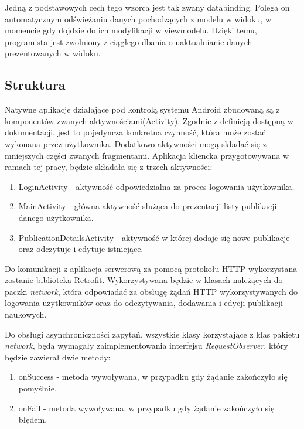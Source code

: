 \documentclass[a4paper,12pt,twoside,openany]{report}
\begin{document}
Jedną z podstawowych cech tego wzorca jest tak zwany databinding. Polega on automatycznym odświeżaniu danych pochodzących z modelu w widoku, w momencie gdy dojdzie do ich modyfikacji w viewmodelu. Dzięki temu, programista jest zwolniony z ciągłego dbania o uaktualnianie danych prezentowanych w widoku.

\newpage
\subsection{Struktura}
Natywne aplikacje działające pod kontrolą systemu Android zbudowaną są z komponentów zwanych aktywnościami(Activity). Zgodnie z definicją dostępną w dokumentacji, jest to  pojedyncza konkretna czynność, która może zostać wykonana przez użytkownika. Dodatkowo aktywności mogą składać się z mniejszych części zwanych fragmentami. Aplikacja kliencka przygotowywana w ramach tej pracy, będzie składała się z trzech aktywności:
\begin{enumerate}
	\item LoginActivity - aktywność odpowiedzialna za proces logowania użytkownika.
	
	\item MainActivity - główna aktywność służąca do prezentacji listy publikacji danego użytkownika. 

	\item PublicationDetailsActivity - aktywność w której dodaje się nowe publikacje oraz odczytuje i edytuje istniejące.

\end{enumerate}

Do komunikacji z aplikacja serwerową za pomocą protokołu HTTP wykorzystana zostanie biblioteka Retrofit. Wykorzystywana będzie w klasach należących do paczki \textit{network}, która odpowiadać za obsługę żądań HTTP wykorzystywanych do logowania użytkowników oraz do odczytywania, dodawania i edycji publikacji naukowych. 

Do obsługi asynchroniczności zapytań, wszystkie klasy korzystające z klas pakietu \textit{network}, będą wymagały zaimplementowania interfejsu \textit{RequestObserver}, który będzie zawierał dwie metody:
\begin{enumerate}
	\item onSuccess - metoda wywoływana, w przypadku gdy żądanie zakończyło się pomyślnie.
	
	\item onFail - metoda wywoływana, w przypadku gdy żądanie zakończyło się błędem.
\end{enumerate}
\end{document}
